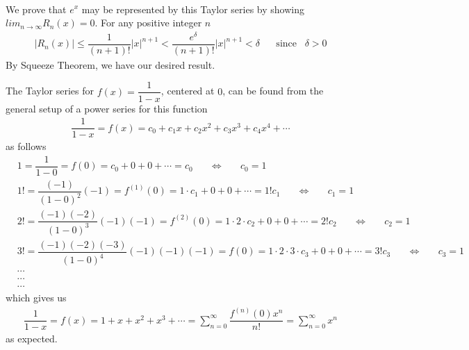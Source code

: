 \begin{example}
\begin{align*}
\end{align*}
We prove that $e^{x}$ may be represented by this Taylor series by showing $lim_{n \longrightarrow \infty}R_{n}(x) = 0$. For any positive integer $n$
\begin{align*}
    \lvert R_{n}(x) \rvert \leq \dfrac{1}{(n+1)!} \lvert x \rvert^{n+1} < \dfrac{e^{\delta}}{(n+1)!} \lvert x \rvert^{n+1} < \delta \hspace{20pt} \text{since} \hspace{10pt} \delta > 0
\end{align*}
By Squeeze Theorem, we have our desired result.
\end{example}


\begin{example}
The Taylor series for $f(x) = \dfrac{1}{1-x}$, centered at $0$, can be found from the general setup of a power series for this function
\begin{align*}
    \dfrac{1}{1-x} = f(x) = c_{0} + c_{1}x + c_{2}x^{2} + c_{3}x^{3} + c_{4}x^{4} + \cdots
\end{align*}
as follows
\begin{align*}
    &1 = \dfrac{1}{1-0} = f(0) = c_{0} + 0 + 0 + \cdots = c_{0} \hspace{20pt} \Longleftrightarrow \hspace{20pt} c_{0} = 1\\[2ex]
    &1! = \dfrac{(-1)}{(1-0)^{2}}(-1) = f^{(1)}(0) = 1 \cdot c_{1} + 0 + 0 + \cdots = 1!c_{1} \hspace{20pt} \Longleftrightarrow \hspace{20pt} c_{1} = 1\\[2ex]
    &2! = \dfrac{(-1)(-2)}{(1-0)^{3}}(-1)(-1) = f^{(2)}(0) = 1 \cdot 2 \cdot c_{2} + 0 + 0 + \cdots = 2!c_{2} \hspace{20pt} \Longleftrightarrow \hspace{20pt} c_{2} = 1\\[2ex]
    &3! = \dfrac{(-1)(-2)(-3)}{(1-0)^{4}}(-1)(-1)(-1) = f(0) = 1 \cdot 2 \cdot 3 \cdot c_{3} + 0 + 0 + \cdots = 3!c_{3} \hspace{20pt} \Longleftrightarrow \hspace{20pt} c_{3} = 1\\[1ex]
    &\cdots\\[1ex]
    &\cdots\\[1ex]
    &\cdots
\end{align*}
which gives us
\begin{align*}
    \dfrac{1}{1-x} = f(x) = 1 + x + x^{2} + x^{3} + \cdots = \sum_{n=0}^{\infty} \dfrac{f^{(n)}(0)x^{n}}{n!} = \sum_{n=0}^{\infty} x^{n}
\end{align*}
as expected.
\end{example}

